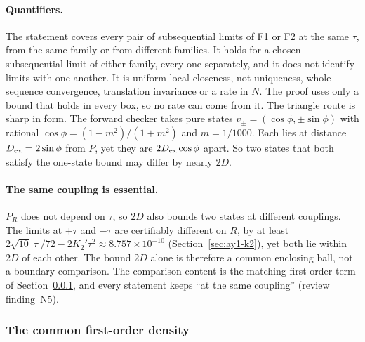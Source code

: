 \paragraph{Quantifiers.}
The statement covers every pair of subsequential limits of F1 or F2 at the
same $\tau$, from the same family or from different families. It holds for a
chosen subsequential limit of either family, every one separately, and it
does not identify limits with one another. It is uniform local closeness, not
uniqueness, whole-sequence convergence, translation invariance or a rate in
$N$. The proof uses only a bound that holds in every box, so no rate can come
from it. The triangle route is sharp in form. The forward checker takes pure
states $v_\pm=(\cos\phi,\pm\sin\phi)$ with rational
$\cos\phi=(1-m^2)/(1+m^2)$ and $m=1/1000$. Each lies at distance
$D_{\rm ex}=2\sin\phi$ from $P$, yet they are $2D_{\rm ex}\cos\phi$ apart. So
two states that both satisfy the one-state bound may differ by nearly $2D$.

\paragraph{The same coupling is essential.}
$P_R$ does not depend on $\tau$, so $2D$ also bounds two states at different
couplings. The limits at $+\tau$ and $-\tau$ are certifiably different on
$R$, by at least $2\sqrt{10}|\tau|/72-2K_2'\tau^2\approx8.757\times10^{-10}$
(Section~\ref{sec:ay1-k2}), yet both lie within $2D$ of each other. The bound
$2D$ alone is therefore a common enclosing ball, not a boundary comparison.
The comparison content is the matching first-order term of
Section~\ref{sec:ay1-density}, and every statement keeps ``at the same
coupling'' (review finding~N5).

\subsubsection{The common first-order density}
\label{sec:ay1-density}

